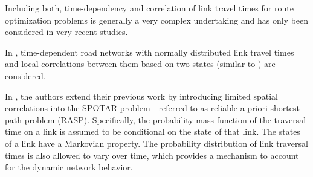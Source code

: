 
Including both, time-dependency and correlation of link travel times for route optimization problems is generally a very complex undertaking and has only been considered in very recent studies.

In \cite{Dong12}, time-dependent road networks with normally distributed link travel times and local correlations between them based on two states (similar to \cite{Nie06}) are considered. 


In \cite{Nie09a}, the authors extend their previous work \cite{Nie09b} by introducing limited spatial correlations into the SPOTAR problem - referred to as reliable a priori shortest path problem (RASP). Specifically, the probability mass function of the traversal time on a link is assumed to be conditional on the state of that link. The states of a link have a Markovian property. The probability distribution of link traversal times is also allowed to vary over time, which provides a mechanism to account for the dynamic network behavior.


